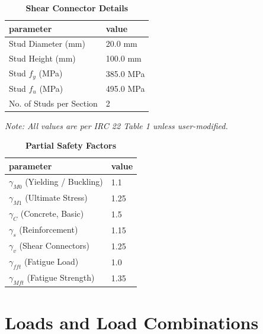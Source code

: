 \documentclass[12pt,a4paper]{report}
\numberwithin{table}{chapter}
\numberwithin{figure}{chapter}
\begin{document}
\label{subsec:shear-connectors}

\vspace{2.2em}

\vspace{0.4em}
\begin{longtable}{|L{5.5cm}|p{10.0cm}|}
\caption{\textbf{Shear Connector Details}}
\hline
\textbf{parameter} & \textbf{value} \\
\hline
\textnormal{Stud Diameter (mm)} & 20.0 mm \\[6pt]
\hline
\textnormal{Stud Height (mm)} & 100.0 mm \\[6pt]
\hline
\textnormal{Stud $f_y$ (MPa)} & 385.0 MPa \\[6pt]
\hline
\textnormal{Stud $f_u$ (MPa)} & 495.0 MPa \\[6pt]
\hline
\textnormal{No. of Studs per Section} & 2 \\[6pt]
\hline
\end{longtable}



\label{subsec:safety-factors}

\vspace{2.2em}

\vspace{0.3em}
\noindent\textit{Note: All values are per IRC 22 Table 1 unless user-modified.}

\vspace{0.4em}
\begin{longtable}{|L{5.5cm}|p{10.0cm}|}
\caption{\textbf{Partial Safety Factors}}
\hline
\textbf{parameter} & \textbf{value} \\
\hline
\textnormal{$\gamma_{M0}$ (Yielding / Buckling)} & 1.1 \\[6pt]
\hline
\textnormal{$\gamma_{M1}$ (Ultimate Stress)} & 1.25 \\[6pt]
\hline
\textnormal{$\gamma_C$ (Concrete, Basic)} & 1.5 \\[6pt]
\hline
\textnormal{$\gamma_s$ (Reinforcement)} & 1.15 \\[6pt]
\hline
\textnormal{$\gamma_v$ (Shear Connectors)} & 1.25 \\[6pt]
\hline
\textnormal{$\gamma_{fft}$ (Fatigue Load)} & 1.0 \\[6pt]
\hline
\textnormal{$\gamma_{Mft}$ (Fatigue Strength)} & 1.35 \\[6pt]
\hline
\end{longtable}


\chapter{Loads and Load Combinations}
\end{document}
